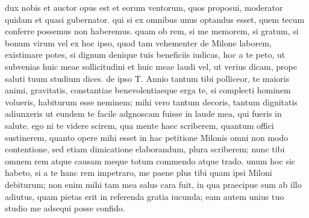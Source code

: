  dux nobis et auctor opus est et eorum ventorum, quos proposui, moderator quidam et quasi gubernator. qui si ex omnibus unus optandus esset, quem tecum conferre possemus non haberemus. quam ob rem, si me memorem, si gratum, si bonum virum vel ex hoc ipso, quod tam vehementer de Milone laborem, existimare potes, si dignum denique tuis beneficiis iudicas, hoc a te peto, ut subvenias huic meae sollicitudini et huic meae laudi vel, ut verius dicam, prope saluti tuum studium dices. de ipso T. Annio tantum tibi polliceor, te maioris animi, gravitatis, constantiae benevolentiaeque erga te, si complecti hominem volueris, habiturum esse neminem; mihi vero tantum decoris, tantum dignitatis adiunxeris ut eundem te facile adgnoscam fuisse in laude mea, qui fueris in salute. ego ni te videre scirem, qua mente haec scriberem, quantum offici sustinerem, quanto opere mihi esset in hac petitione Milonis omni non modo contentione, sed etiam dimicatione elaborandum, plura scriberem; nunc tibi omnem rem atque causam meque totum commendo atque trado. unum hoc sic habeto, si a te hanc rem impetraro, me paene plus tibi quam ipsi Miloni debiturum; non enim mihi tam mea salus cara fuit, in qua praecipue sum ab illo adiutus, quam pietas erit in referenda gratia iucunda; eam autem unius tuo studio me adsequi posse confido.
